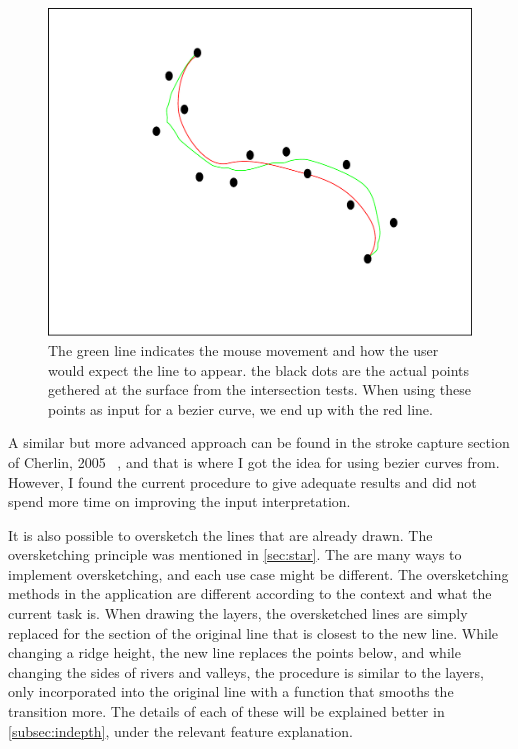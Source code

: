 \documentclass[a4paper,12pt]{article}
\newcommand{\secref}[1]{\autoref{#1}, \nameref{#1}}
\begin{document}
\begin{figure}
 \includegraphics[width=\linewidth]{thesis/bezierSmooth.pdf}
 \caption{The green line indicates the mouse movement and how the user would expect the line to appear. the black dots are the actual points gethered at the surface from the intersection tests. When using these points as input for a bezier curve, we end up with the red line.}
 \label{fig:bezierSmooth}
\end{figure}


A similar but more advanced approach can be found in the stroke capture section of Cherlin, 2005 ~\cite{Cherlin:2005:SMF:1090122.1090145}, and that is where I got the idea for using bezier curves from. However, I found the current procedure to give adequate results and did not spend more time on improving the input interpretation.

It is also possible to oversketch the lines that are already drawn. The oversketching principle was mentioned in \ref{sec:star}. The are many ways to implement oversketching, and each use case might be different. The oversketching methods in the application are different according to the context and what the current task is. When drawing the layers, the oversketched lines are simply replaced for the section of the original line that is closest to the new line. While changing a ridge height, the new line replaces the points below, and while changing the sides of rivers and valleys, the procedure is similar to the layers, only incorporated into the original line with a function that smooths the transition more. The details of each of these will be explained better in \secref{subsec:indepth} under the relevant feature explanation.
\end{document}
